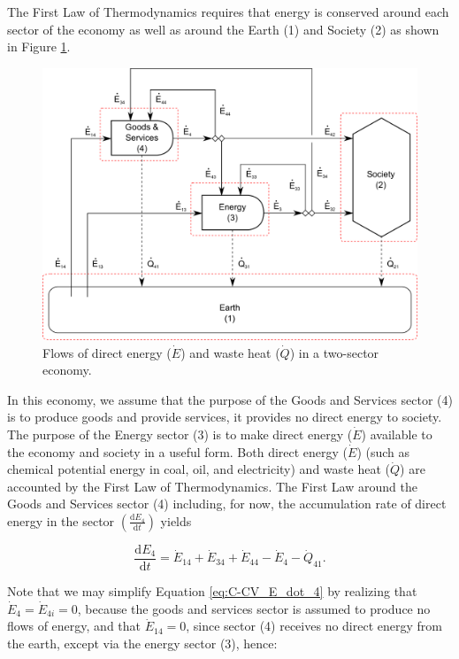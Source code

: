 The First Law of Thermodynamics requires that energy is conserved around each sector of the economy as well as around the Earth (1) and Society (2) as shown in Figure \ref{fig:direct_energy_flows_2}. 

\begin{figure}[h!]
\includegraphics[width=1.0\linewidth]{Chapter_Example_C/images/I-O_three_sector_direct_energy.pdf}
\caption{Flows of direct energy ($\dot{E}$) and waste heat ($\dot{Q}$) in a two-sector economy.}
\label{fig:direct_energy_flows_2}
\end{figure}

In this economy, we assume that the purpose of the Goods and Services sector (4) is to produce goods and provide services, it provides no direct energy to society. The purpose of the Energy sector (3) is to make direct energy ($\dot{E}$) available to the economy and society in a useful form. Both direct energy ($\dot{E}$) (such as chemical potential energy in coal, oil, and electricity) and waste heat ($\dot{Q}$) are accounted by the First Law of Thermodynamics. The First Law around the Goods and Services sector (4) including, for now, the accumulation rate of direct energy in the sector $\left(\frac{\mathrm{d}E_{4}}{\mathrm{d}t}\right)$ yields

\begin{equation} \label{eq:C-CV_E_dot_4}
	\frac{\mathrm{d}E_{4}}{\mathrm{d}t} 	 =  \dot{E}_{14} + \dot{E}_{34} + \dot{E}_{44} - \dot{E}_4 - \dot{Q}_{41}.
\end{equation}

Note that we may simplify Equation \ref{eq:C-CV_E_dot_4} by realizing that $\dot{E}_{4} = \dot{E}_{4i} = 0$, because the goods and services sector is assumed to produce no flows of energy, and that $\dot{E}_{14} = 0$, since sector (4) receives no direct energy from the earth, except via the energy sector (3), hence:

